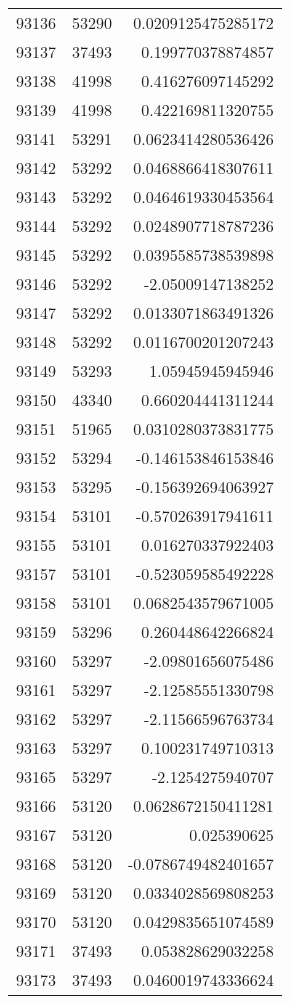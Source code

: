 \begin{tabular}{r | r | r}
93136 & 53290 & 0.0209125475285172 \\
93137 & 37493 & 0.199770378874857 \\
93138 & 41998 & 0.416276097145292 \\
93139 & 41998 & 0.422169811320755 \\
93141 & 53291 & 0.0623414280536426 \\
93142 & 53292 & 0.0468866418307611 \\
93143 & 53292 & 0.0464619330453564 \\
93144 & 53292 & 0.0248907718787236 \\
93145 & 53292 & 0.0395585738539898 \\
93146 & 53292 & -2.05009147138252 \\
93147 & 53292 & 0.0133071863491326 \\
93148 & 53292 & 0.0116700201207243 \\
93149 & 53293 & 1.05945945945946 \\
93150 & 43340 & 0.660204441311244 \\
93151 & 51965 & 0.0310280373831775 \\
93152 & 53294 & -0.146153846153846 \\
93153 & 53295 & -0.156392694063927 \\
93154 & 53101 & -0.570263917941611 \\
93155 & 53101 & 0.016270337922403 \\
93157 & 53101 & -0.523059585492228 \\
93158 & 53101 & 0.0682543579671005 \\
93159 & 53296 & 0.260448642266824 \\
93160 & 53297 & -2.09801656075486 \\
93161 & 53297 & -2.12585551330798 \\
93162 & 53297 & -2.11566596763734 \\
93163 & 53297 & 0.100231749710313 \\
93165 & 53297 & -2.1254275940707 \\
93166 & 53120 & 0.0628672150411281 \\
93167 & 53120 & 0.025390625 \\
93168 & 53120 & -0.0786749482401657 \\
93169 & 53120 & 0.0334028569808253 \\
93170 & 53120 & 0.0429835651074589 \\
93171 & 37493 & 0.053828629032258 \\
93173 & 37493 & 0.0460019743336624 \\

\end{tabular}
